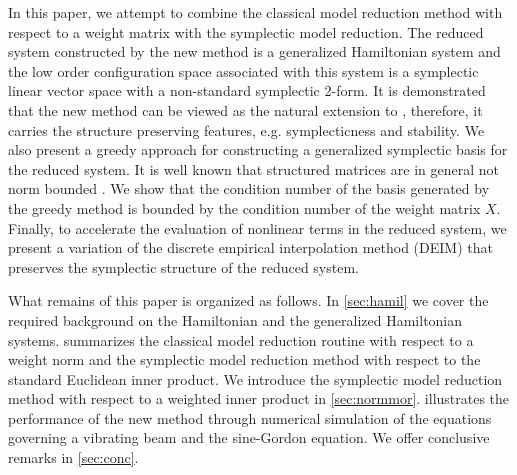 In this paper, we attempt to combine the classical model reduction method with respect to a weight matrix with the symplectic model reduction. The reduced system constructed by the new method is a generalized Hamiltonian system and the low order configuration space associated with this system is a symplectic linear vector space with a non-standard symplectic 2-form. It is demonstrated that the new method can be viewed as the natural extension to \cite{doi:10.1137/17M1111991}, therefore, it carries the structure preserving features, e.g. symplecticness and stability. We also present a greedy approach for constructing a generalized symplectic basis for the reduced system. It is well known that structured matrices are in general not norm bounded \cite{Karow:2006cf}. We show that the condition number of the basis generated by the greedy method is bounded by the condition number of the weight matrix $X$. Finally, to accelerate the evaluation of nonlinear terms in the reduced system, we present a variation of the discrete empirical interpolation method (DEIM) that preserves the symplectic structure of the reduced system.

What remains of this paper is organized as follows. In \cref{sec:hamil} we cover the required background on the Hamiltonian and the generalized Hamiltonian systems.  summarizes the classical model reduction routine with respect to a weight norm and the symplectic model reduction method with respect to the standard Euclidean inner product. We introduce the symplectic model reduction method with respect to a weighted inner product in \cref{sec:normmor}.  illustrates the performance of the new method through numerical simulation of the equations governing a vibrating beam and the sine-Gordon equation. We offer conclusive remarks in \cref{sec:conc}.